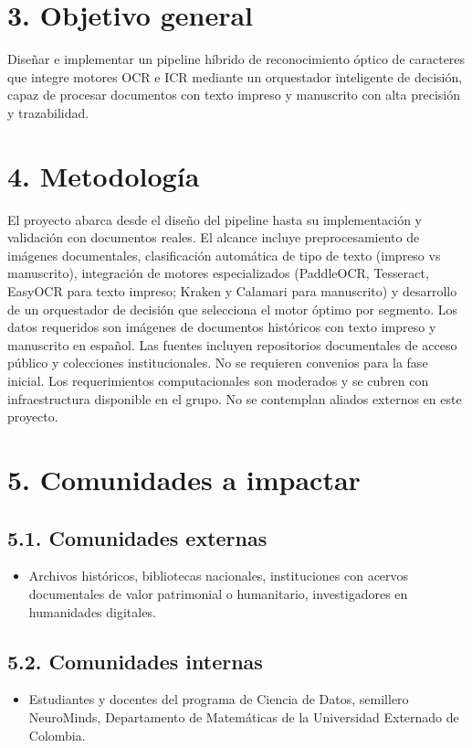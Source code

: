\documentclass[a4paper,12pt]{article}
\begin{document}
\section*{3. Objetivo general}
Diseñar e implementar un pipeline híbrido de reconocimiento óptico de caracteres que integre motores OCR e ICR mediante un orquestador inteligente de decisión, capaz de procesar documentos con texto impreso y manuscrito con alta precisión y trazabilidad.

\section*{4. Metodología}
El proyecto abarca desde el diseño del pipeline hasta su implementación y validación con documentos reales. El alcance incluye preprocesamiento de imágenes documentales, clasificación automática de tipo de texto (impreso vs manuscrito), integración de motores especializados (PaddleOCR, Tesseract, EasyOCR para texto impreso; Kraken y Calamari para manuscrito) y desarrollo de un orquestador de decisión que selecciona el motor óptimo por segmento. Los datos requeridos son imágenes de documentos históricos con texto impreso y manuscrito en español. Las fuentes incluyen repositorios documentales de acceso público y colecciones institucionales. No se requieren convenios para la fase inicial. Los requerimientos computacionales son moderados y se cubren con infraestructura disponible en el grupo. No se contemplan aliados externos en este proyecto.

\section*{5. Comunidades a impactar}
\subsection*{5.1. Comunidades externas}
\begin{itemize}
    \item Archivos históricos, bibliotecas nacionales, instituciones con acervos documentales de valor patrimonial o humanitario, investigadores en humanidades digitales.
\end{itemize}

\subsection*{5.2. Comunidades internas}
\begin{itemize}
    \item Estudiantes y docentes del programa de Ciencia de Datos, semillero NeuroMinds, Departamento de Matemáticas de la Universidad Externado de Colombia.
\end{itemize}
\end{document}
